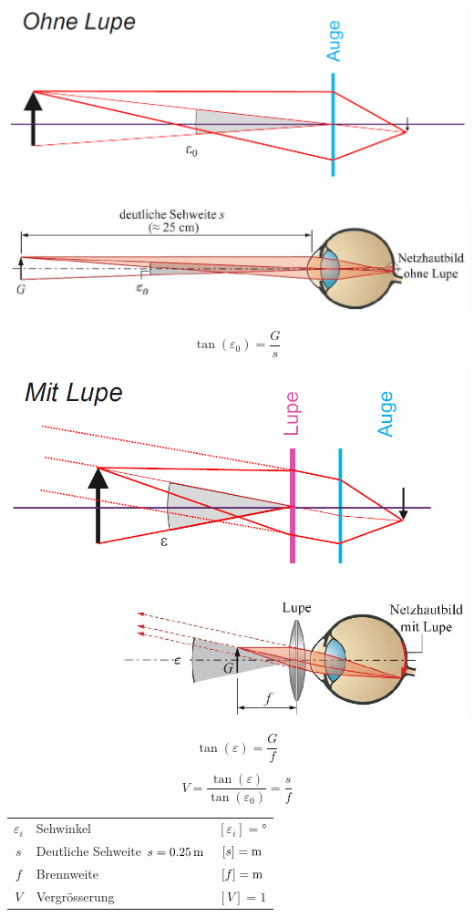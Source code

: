\begin{minipage}{0.48\linewidth}
\includegraphics[width=0.9\linewidth]{Bilder/Wellen-Optik/ohne_lupe}

$$ \boxed{ \tan(\varepsilon_0) = \frac{G}{s} } $$
\end{minipage}
\hfill
\begin{minipage}{0.48\linewidth}
\includegraphics[width=0.9\linewidth]{Bilder/Wellen-Optik/mit_lupe}

$$ \boxed{ \tan(\varepsilon) = \frac{G}{f} } $$
\end{minipage}

$$ \boxed{ V = \frac{\tan(\varepsilon)}{\tan(\varepsilon_0)} = \frac{s}{f} } $$


\begin{tabular}{c l c}
	$\varepsilon_i$ & Sehwinkel & $[\varepsilon_i] =$° \\
	$s$ & Deutliche Sehweite $s =0.25 \, \mathrm{m}$ & $[s] = \mathrm{m}$ \\
	$f$ & Brennweite & $[f] = \mathrm{m}$ \\
	$V$ & Vergrösserung & $[V] = 1$ \\
\end{tabular}


